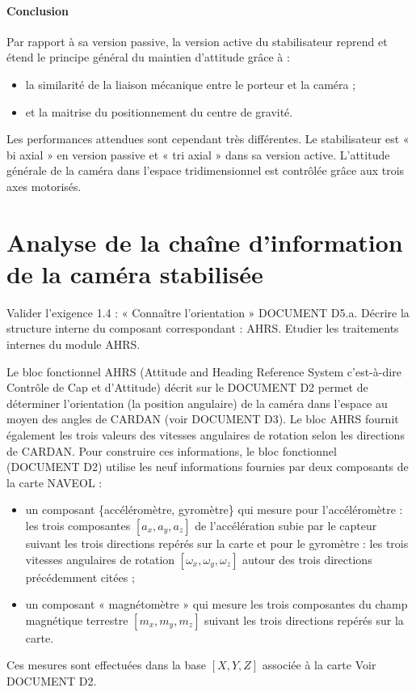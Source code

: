 \documentclass[10pt,fleqn]{article} %
\begin{document}
\paragraph*{Conclusion}
Par rapport à sa version passive, la version active du stabilisateur reprend et étend le principe général du maintien d'attitude grâce à :
\begin{itemize}
\item la similarité de la liaison mécanique entre le porteur et la caméra ; 
\item et la maitrise du positionnement du centre de gravité. 
\end{itemize}
Les performances attendues sont cependant très différentes. Le stabilisateur est « bi axial » en  version  passive  et  « tri axial » dans sa version active. L’attitude générale de la caméra dans l’espace tridimensionnel est contrôlée grâce aux trois axes motorisés.

\section{Analyse de la chaîne d’information de la caméra stabilisée}

\begin{obj}
Valider l’exigence 1.4 : « Connaître l’orientation » DOCUMENT D5.a. Décrire la structure interne du composant correspondant : AHRS. Etudier les traitements internes du module AHRS.
\end{obj}

Le bloc fonctionnel AHRS (Attitude and Heading Reference System c’est-à-dire Contrôle de Cap et d’Attitude) décrit sur le DOCUMENT D2 permet de déterminer l’orientation (la position angulaire) de la caméra dans l’espace au moyen des angles de CARDAN (voir DOCUMENT D3). Le bloc AHRS fournit également les trois valeurs des vitesses angulaires de rotation selon les directions de CARDAN. 
Pour construire ces informations, le bloc fonctionnel (DOCUMENT D2) utilise les neuf informations fournies par deux composants de la carte NAVEOL :
 \begin{itemize}
 \item un composant \{accéléromètre, gyromètre\} qui mesure pour l’accéléromètre : les trois composantes $[a_x, a_y, a_z]$ de l’accélération subie par le capteur suivant les trois directions repérés sur la carte et pour le gyromètre : les trois vitesses angulaires de rotation $[\omega_x,\omega_y,\omega_z]$ autour des trois directions précédemment citées ;
 \item un composant  « magnétomètre » qui mesure les trois composantes du champ magnétique terrestre $[m_x, m_y, m_z]$ suivant les trois directions repérés sur la carte.
 \end{itemize}
Ces mesures sont effectuées dans la base $[X, Y, Z]$ associée à la carte Voir DOCUMENT D2.
\end{document}
